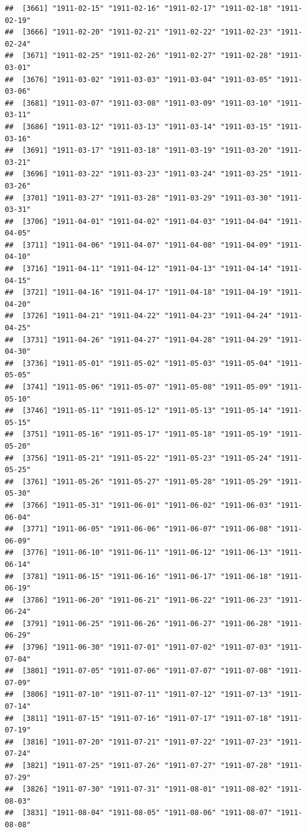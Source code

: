 \documentclass{article}\usepackage[]{graphicx}\usepackage[]{color}
\makeatletter
\newenvironment{kframe}{%
 \def\at@end@of@kframe{}%
 \ifinner\ifhmode%
  \def\at@end@of@kframe{\end{minipage}}%
  \begin{minipage}{\columnwidth}%
 \fi\fi%
 \def\FrameCommand##1{\hskip\@totalleftmargin \hskip-\fboxsep
 \colorbox{shadecolor}{##1}\hskip-\fboxsep
     \hskip-\linewidth \hskip-\@totalleftmargin \hskip\columnwidth}%
 \MakeFramed {\advance\hsize-\width
   \@totalleftmargin\z@ \linewidth\hsize
   \@setminipage}}%
 {\par\unskip\endMakeFramed%
 \at@end@of@kframe}
\newenvironment{knitrout}{}{} %
\makeatother
\begin{document}
\begin{description}
\begin{knitrout}
\begin{kframe}
\begin{verbatim}
##  [3661] "1911-02-15" "1911-02-16" "1911-02-17" "1911-02-18" "1911-02-19"
##  [3666] "1911-02-20" "1911-02-21" "1911-02-22" "1911-02-23" "1911-02-24"
##  [3671] "1911-02-25" "1911-02-26" "1911-02-27" "1911-02-28" "1911-03-01"
##  [3676] "1911-03-02" "1911-03-03" "1911-03-04" "1911-03-05" "1911-03-06"
##  [3681] "1911-03-07" "1911-03-08" "1911-03-09" "1911-03-10" "1911-03-11"
##  [3686] "1911-03-12" "1911-03-13" "1911-03-14" "1911-03-15" "1911-03-16"
##  [3691] "1911-03-17" "1911-03-18" "1911-03-19" "1911-03-20" "1911-03-21"
##  [3696] "1911-03-22" "1911-03-23" "1911-03-24" "1911-03-25" "1911-03-26"
##  [3701] "1911-03-27" "1911-03-28" "1911-03-29" "1911-03-30" "1911-03-31"
##  [3706] "1911-04-01" "1911-04-02" "1911-04-03" "1911-04-04" "1911-04-05"
##  [3711] "1911-04-06" "1911-04-07" "1911-04-08" "1911-04-09" "1911-04-10"
##  [3716] "1911-04-11" "1911-04-12" "1911-04-13" "1911-04-14" "1911-04-15"
##  [3721] "1911-04-16" "1911-04-17" "1911-04-18" "1911-04-19" "1911-04-20"
##  [3726] "1911-04-21" "1911-04-22" "1911-04-23" "1911-04-24" "1911-04-25"
##  [3731] "1911-04-26" "1911-04-27" "1911-04-28" "1911-04-29" "1911-04-30"
##  [3736] "1911-05-01" "1911-05-02" "1911-05-03" "1911-05-04" "1911-05-05"
##  [3741] "1911-05-06" "1911-05-07" "1911-05-08" "1911-05-09" "1911-05-10"
##  [3746] "1911-05-11" "1911-05-12" "1911-05-13" "1911-05-14" "1911-05-15"
##  [3751] "1911-05-16" "1911-05-17" "1911-05-18" "1911-05-19" "1911-05-20"
##  [3756] "1911-05-21" "1911-05-22" "1911-05-23" "1911-05-24" "1911-05-25"
##  [3761] "1911-05-26" "1911-05-27" "1911-05-28" "1911-05-29" "1911-05-30"
##  [3766] "1911-05-31" "1911-06-01" "1911-06-02" "1911-06-03" "1911-06-04"
##  [3771] "1911-06-05" "1911-06-06" "1911-06-07" "1911-06-08" "1911-06-09"
##  [3776] "1911-06-10" "1911-06-11" "1911-06-12" "1911-06-13" "1911-06-14"
##  [3781] "1911-06-15" "1911-06-16" "1911-06-17" "1911-06-18" "1911-06-19"
##  [3786] "1911-06-20" "1911-06-21" "1911-06-22" "1911-06-23" "1911-06-24"
##  [3791] "1911-06-25" "1911-06-26" "1911-06-27" "1911-06-28" "1911-06-29"
##  [3796] "1911-06-30" "1911-07-01" "1911-07-02" "1911-07-03" "1911-07-04"
##  [3801] "1911-07-05" "1911-07-06" "1911-07-07" "1911-07-08" "1911-07-09"
##  [3806] "1911-07-10" "1911-07-11" "1911-07-12" "1911-07-13" "1911-07-14"
##  [3811] "1911-07-15" "1911-07-16" "1911-07-17" "1911-07-18" "1911-07-19"
##  [3816] "1911-07-20" "1911-07-21" "1911-07-22" "1911-07-23" "1911-07-24"
##  [3821] "1911-07-25" "1911-07-26" "1911-07-27" "1911-07-28" "1911-07-29"
##  [3826] "1911-07-30" "1911-07-31" "1911-08-01" "1911-08-02" "1911-08-03"
##  [3831] "1911-08-04" "1911-08-05" "1911-08-06" "1911-08-07" "1911-08-08"

\end{verbatim}
\end{kframe}
\end{knitrout}
\end{description}
\end{document}
